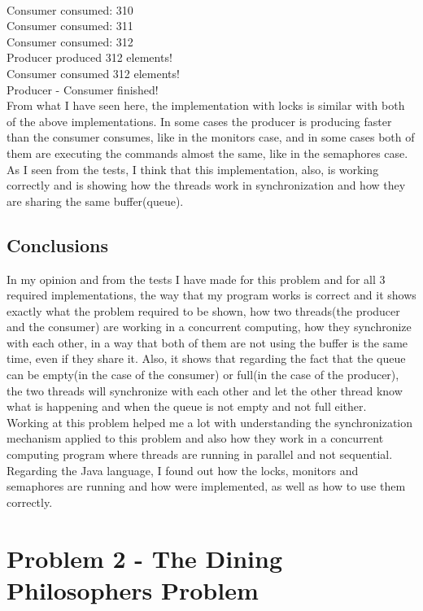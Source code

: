 \documentclass[14pt]{article}
\begin{document}
\\Consumer consumed: 310
\\Consumer consumed: 311
\\Consumer consumed: 312
\\Producer produced 312 elements!
\\Consumer consumed 312 elements!
\\Producer - Consumer finished!
\vspace{2.5 mm}
\\From what I have seen here, the implementation with locks is similar with both of the above implementations. In some cases the producer is producing faster than the consumer consumes, like in the monitors case, and in some cases both of them are executing the commands almost the same, like in the semaphores case. As I seen from the tests, I think that this implementation, also, is working correctly and is showing how the threads work in synchronization and how they are sharing the same buffer(queue).
\subsection{Conclusions}
In my opinion and from the tests I have made for this problem and for all 3 required implementations, the way that my program works is correct and it shows exactly what the problem required to be shown, how two threads(the producer and the consumer) are working in a concurrent computing, how they synchronize with each other, in a way that both of them are not using the buffer is the same time, even if they share it. Also, it shows that regarding the fact that the queue can be empty(in the case of the consumer) or full(in the case of the producer), the two threads will synchronize with each other and let the other thread know what is happening and when the queue is not empty and not full either.
\vspace{2.5 mm}
\\Working at this problem helped me a lot with understanding the synchronization mechanism applied to this problem and also how they work in a concurrent computing program where threads are running in parallel and not sequential.
\vspace{2.5 mm}
\\Regarding the Java language, I found out how the locks, monitors and semaphores are running and how were implemented, as well as how to use them correctly.

\newpage
\section{Problem 2 - The Dining Philosophers Problem}
\end{document}
